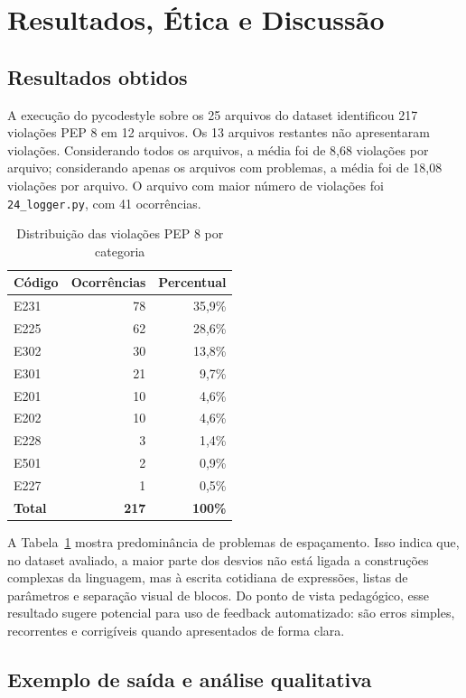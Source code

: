 \documentclass[12pt]{article}
\begin{document}
\section{Resultados, Ética e Discussão}

\subsection{Resultados obtidos}

A execução do pycodestyle sobre os 25 arquivos do dataset identificou
217 violações PEP 8 em 12 arquivos. Os 13 arquivos restantes não apresentaram
violações. Considerando todos os arquivos, a média foi de 8,68 violações por
arquivo; considerando apenas os arquivos com problemas, a média foi de 18,08
violações por arquivo. O arquivo com maior número de violações foi
\texttt{24\_logger.py}, com 41 ocorrências.

\begin{table}[ht]
\centering
\caption{Distribuição das violações PEP 8 por categoria}
\label{tab:violacoes}
\begin{tabular}{lrr}
\toprule
\textbf{Código} & \textbf{Ocorrências} & \textbf{Percentual}\\
\midrule
E231 & 78 & 35,9\%\\
E225 & 62 & 28,6\%\\
E302 & 30 & 13,8\%\\
E301 & 21 & 9,7\%\\
E201 & 10 & 4,6\%\\
E202 & 10 & 4,6\%\\
E228 & 3 & 1,4\%\\
E501 & 2 & 0,9\%\\
E227 & 1 & 0,5\%\\
\midrule
\textbf{Total} & \textbf{217} & \textbf{100\%}\\
\bottomrule
\end{tabular}
\end{table}

A Tabela~\ref{tab:violacoes} mostra predominância de problemas de espaçamento.
Isso indica que, no dataset avaliado, a maior parte dos desvios não está ligada
a construções complexas da linguagem, mas à escrita cotidiana de expressões,
listas de parâmetros e separação visual de blocos. Do ponto de vista pedagógico,
esse resultado sugere potencial para uso de feedback automatizado: são erros
simples, recorrentes e corrigíveis quando apresentados de forma clara.

\subsection{Exemplo de saída e análise qualitativa}
\end{document}

